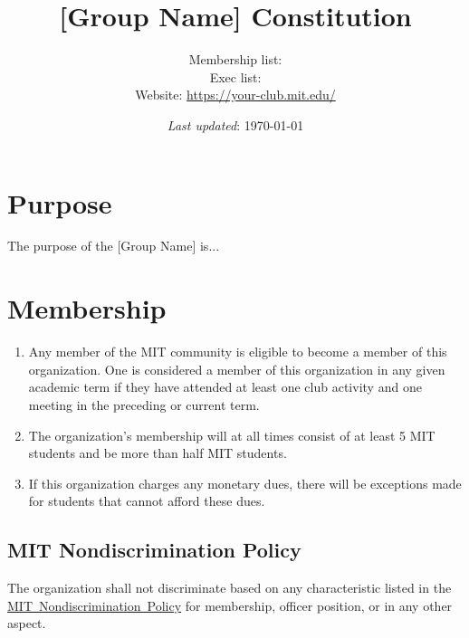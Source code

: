 \documentclass[12pt]{article}
\def\groupname{[Group Name]\xspace}
\begin{document}
\title{\groupname Constitution}
\author{%
    Membership list:  \\
    Exec list:  \\
    Website: \url{https://your-club.mit.edu/}
}
\date{\textit{Last updated}: \today}

\maketitle




\section{Purpose}
The purpose of the \groupname is...

\section{Membership}
\begin{enumerate}
    \item Any member of the MIT community is eligible to become a member of this organization.
    One is considered a member of this organization in any given academic term if they have attended at least one club activity and one meeting in the preceding or current term.

    \item The organization’s membership will at all times consist of at least 5 MIT students and be more than half MIT students.

    \item If this organization charges any monetary dues, there will be exceptions made for students that cannot afford these dues.
\end{enumerate}

\subsection{MIT Nondiscrimination Policy}
The organization shall not discriminate based on any characteristic listed in the \href{https://policies.mit.edu/policies-procedures/90-relations-and-responsibilities-within-mit-community/93-nondiscrimination}{MIT~Nondiscrimination~Policy} for membership, officer position, or in any other aspect.
\end{document}
